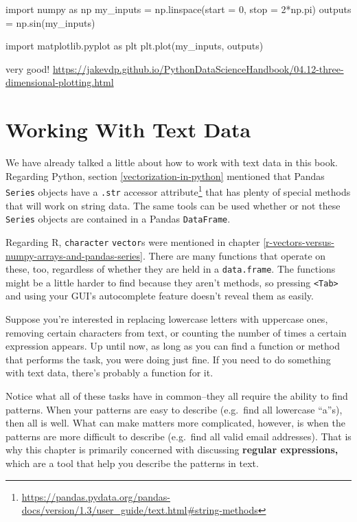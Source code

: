 \documentclass[
  12pt,
  krantz2]{krantz}
\renewcommand{\href}[2]{#2\footnote{\url{#1}}}
\begin{document}
import numpy as np
my\_inputs = np.linspace(start = 0, stop = 2*np.pi)
outputs = np.sin(my\_inputs)

import matplotlib.pyplot as plt
plt.plot(my\_inputs, outputs)

very good! \url{https://jakevdp.github.io/PythonDataScienceHandbook/04.12-three-dimensional-plotting.html}

\hypertarget{working-with-text-data}{%
\chapter{Working With Text Data}\label{working-with-text-data}}

We have already talked a little about how to work with text data in this book. Regarding Python, section \ref{vectorization-in-python} mentioned that Pandas \texttt{Series} objects have a \href{https://pandas.pydata.org/pandas-docs/version/1.3/user_guide/text.html\#string-methods}{\texttt{.str} accessor attribute} that has plenty of special methods that will work on string data. The same tools can be used whether or not these \texttt{Series} objects are contained in a Pandas \texttt{DataFrame}.

Regarding R, \texttt{character} \texttt{vector}s were mentioned in chapter \ref{r-vectors-versus-numpy-arrays-and-pandas-series}. There are many functions that operate on these, too, regardless of whether they are held in a \texttt{data.frame}. The functions might be a little harder to find because they aren't methods, so pressing \texttt{\textless{}Tab\textgreater{}} and using your GUI's autocomplete feature doesn't reveal them as easily.

Suppose you're interested in replacing lowercase letters with uppercase ones, removing certain characters from text, or counting the number of times a certain expression appears. Up until now, as long as you can find a function or method that performs the task, you were doing just fine. If you need to do something with text data, there's probably a function for it.

Notice what all of these tasks have in common--they all require the ability to find patterns. When your patterns are easy to describe (e.g.~find all lowercase ``a''s), then all is well. What can make matters more complicated, however, is when the patterns are more difficult to describe (e.g.~find all valid email addresses). That is why this chapter is primarily concerned with discussing \textbf{regular expressions,} which are a tool that help you describe the patterns in text.
\end{document}
